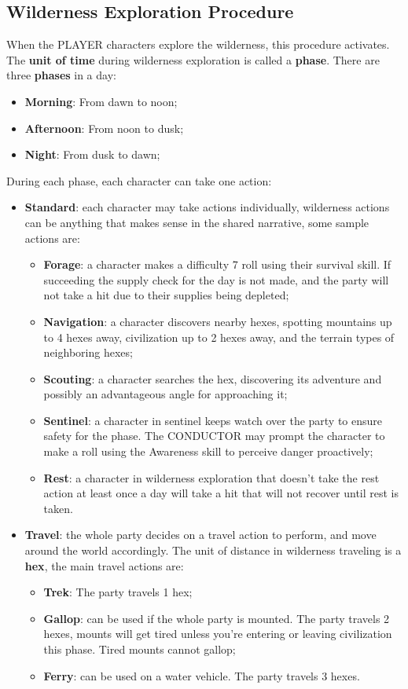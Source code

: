\subsection{Wilderness Exploration Procedure}
When the PLAYER characters explore the wilderness, this procedure activates. The \textbf{unit of time} during wilderness exploration is called a \textbf{phase}. There are three \textbf{phases} in a day:
\begin{itemize}
    \item {\textbf{Morning}: From dawn to noon;}
    \item {\textbf{Afternoon}: From noon to dusk;}
    \item {\textbf{Night}: From dusk to dawn;}
\end{itemize}
During each phase, each character can take one action:
\begin{itemize}
    \item {\textbf{Standard}: each character may take actions individually, wilderness actions can be anything that makes sense in the shared narrative, some sample actions are:
    \begin{itemize}
        \item {\textbf{Forage}: a character makes a difficulty 7 roll using their survival skill. If succeeding the supply check for the day is not made, and the party will not take a hit due to their supplies being depleted;}
        \item {\textbf{Navigation}: a character discovers nearby hexes, spotting mountains up to 4 hexes away, civilization up to 2 hexes away, and the terrain types of neighboring hexes;}
        \item {\textbf{Scouting}: a character searches the hex, discovering its adventure and possibly an advantageous angle for approaching it;}
        \item {\textbf{Sentinel}: a character in sentinel keeps watch over the party to ensure safety for the phase. The CONDUCTOR may prompt the character to make a roll using the Awareness skill to perceive danger proactively;}
        \item {\textbf{Rest}: a character in wilderness exploration that doesn't take the rest action at least once a day will take a hit that will not recover until rest is taken.}
    \end{itemize}
    }
    \item {\textbf{Travel}: the whole party decides on a travel action to perform, and move around the world accordingly. The unit of distance in wilderness traveling is a \textbf{hex}, the main travel actions are:
    \begin{itemize}
        \item {\textbf{Trek}: The party travels 1 hex;}
        \item {\textbf{Gallop}: can be used if the whole party is mounted. The party travels 2 hexes, mounts will get tired unless you're entering or leaving civilization this phase. Tired mounts cannot gallop;}
        \item {\textbf{Ferry}: can be used on a water vehicle. The party travels 3 hexes.}
    \end{itemize}
    }
\end{itemize}
